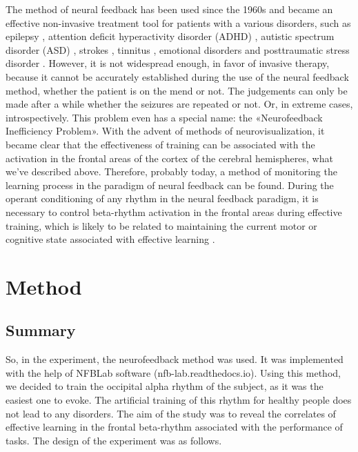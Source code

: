 \documentclass[14pt,a4paper]{scrartcl}
\begin{document}
The method of neural feedback has been used since the 1960s and became an effective non-invasive treatment tool for patients with a various disorders, such as epilepsy \cite{Strehl2014,Kotchoubey2001}, attention deficit hyperactivity disorder (ADHD) \cite{Leins2007,Sonuga-Barke2013,Thompson2005}, autistic spectrum disorder (ASD) \cite{Kouijzer2009,Thompson2009}, strokes \cite{Rayegani2014}, tinnitus \cite{Hartmann2014}, emotional disorders \cite{Raymond2005} and posttraumatic stress disorder \cite{Othmer2009}. However, it is not widespread enough, in favor of invasive therapy, because it cannot be accurately established during the use of the neural feedback method, whether the patient is on the mend or not. The judgements can only be made after a while whether the seizures are repeated or not. Or, in extreme cases, introspectively. This problem even has a special name: the «Neurofeedback Inefficiency Problem». With the advent of methods of neurovisualization, it became clear that the effectiveness of training can be associated with the activation in the frontal areas of the cortex of the cerebral hemispheres, what we’ve described above. Therefore, probably today, a method of monitoring the learning process in the paradigm of neural feedback can be found. During the operant conditioning of any rhythm in the neural feedback paradigm, it is necessary to control beta-rhythm activation in the frontal areas during effective training, which is likely to be related to maintaining the current motor or cognitive state associated with effective learning \cite{Engel2010}.

\newpage
\section{Method}
\label{sec:Method}  

\subsection{Summary}
\label{sec:Methods:Summary}

So, in the experiment, the neurofeedback method was used. It was implemented with the help of NFBLab software (nfb-lab.readthedocs.io). Using this method, we decided to train the occipital alpha rhythm of the subject, as it was the easiest one to evoke. The artificial training of this rhythm for healthy people does not lead to any disorders. The aim of the study was to reveal the correlates of effective learning in the frontal beta-rhythm associated with the performance of tasks. The design of the experiment was as follows.
\end{document}

